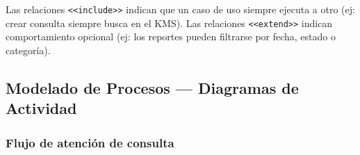 \documentclass[12pt,a4paper]{article}
\begin{document}
	Las relaciones \texttt{\textless\textless include\textgreater\textgreater} indican que un caso de uso siempre ejecuta a otro (ej: crear consulta siempre busca en el KMS). Las relaciones \texttt{\textless\textless extend\textgreater\textgreater} indican comportamiento opcional (ej: los reportes pueden filtrarse por fecha, estado o categoría).

	\subsection{Modelado de Procesos — Diagramas de Actividad}

	\subsubsection{Flujo de atención de consulta}
\end{document}
